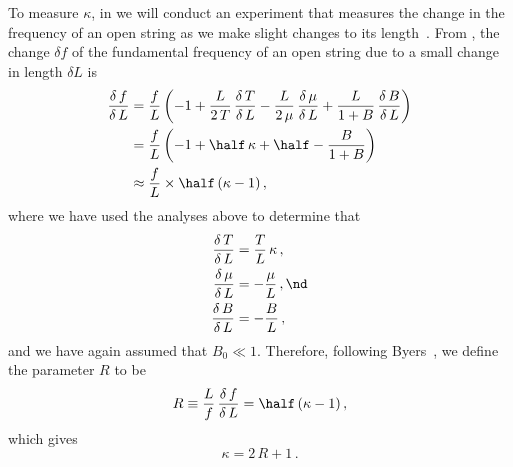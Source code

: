 
To measure $\kappa$, in  we will conduct an experiment that measures the change in the frequency of an open string as we make slight changes to its length~\cite{ref:byers1996cgi,ref:varieschi2010icf}. From , the change $\delta f$ of the fundamental frequency of an open string due to a small  change in length $\delta L$ is
 \begin{equation}
 \begin{split}
\frac{\delta\, f}{\delta\, L} &= \frac{f}{L} \left( -1 + \frac{L}{2\, T}\, \frac{\delta\, T}{\delta\, L} - \frac{L}{2\, \mu}\, \frac{\delta\, \mu}{\delta\, L} + \frac{L}{1 + B}\, \frac{\delta\, B}{\delta\, L} \right) \\
&= \frac{f}{L} \left( -1 + \half\, \kappa + \half - \frac{B}{1 + B} \right) \\
&\approx \frac{f}{L} \times \half\, (\kappa - 1)\, ,
 \end{split}
 \end{equation}
where we have used the analyses above to determine that
 \begin{subequations}
 \begin{align}
\frac{\delta\, T}{\delta\, L} &= \frac{T}{L}\, \kappa\, , \\
\frac{\delta\, \mu}{\delta\, L} &= -\frac{\mu}{L}\, , \nd \\
\frac{\delta\, B}{\delta\, L} &= -\frac{B}{L}\, ,
 \end{align}
 \end{subequations}
and we have again assumed that $B_0 \ll 1$. Therefore, following Byers~\cite{ref:byers1996cgi,ref:varieschi2010icf}, we define the parameter $R$ to be
 \begin{equation}\label{eqn:r_def}
R \equiv \frac{L}{f}\, \frac{\delta\, f}{\delta\, L} = \half\, (\kappa - 1)\, ,
 \end{equation}
which gives
 \begin{equation} \label{eqn:kappa_r}
\kappa = 2\, R + 1\, .
 \end{equation}

